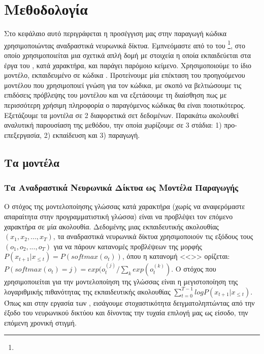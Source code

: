 \chapter{Μεθοδολογία}
Στο κεφάλαιο αυτό περιγράφεται η προσέγγιση μας στην παραγωγή κώδικα χρησιμοποιώντας αναδραστικά νευρωνικά δίκτυα.
Εμπνεόμαστε από το  του \footnote{}, στο οποίο χρησιμοποιείται μια σχετικά απλή δομή  με  στοιχεία η οποία εκπαιδεύεται στα έργα του , κατά χαρακτήρα, και παράγει παρόμοιο κείμενο.
Χρησιμοποιούμε το ίδιο μοντέλο, εκπαιδευμένο σε κώδικα .
Προτείνουμε μία επέκταση του προηγούμενου μοντέλου που χρησιμοποιεί  γνώση για τον κώδικα, με σκοπό να βελτιώσουμε τις επιδόσεις πρόβλεψης του μοντέλου και να εξετάσουμε τη διαίσθηση πως με περισσότερη χρήσιμη πληροφορία ο παραγόμενος κώδικας θα είναι ποιοτικότερος.
Εξετάζουμε τα μοντέλα σε 2 διαφορετικά σετ δεδομένων.
Παρακάτω ακολουθεί αναλυτική παρουσίαση της μεθόδου, την οποία χωρίζουμε σε 3 στάδια: 1) προ-επεξεργασία, 2) εκπαίδευση και 3) παραγωγή.

\section{Τα μοντέλα}

\subsection{Τα Αναδραστικά Νευρωνικά Δίκτυα ως Μοντέλα Παραγωγής}
Ο στόχος της μοντελοποίησης γλώσσας κατά χαρακτήρα (χωρίς να αναφερόμαστε απαραίτητα στην προγραμματιστική γλώσσα) είναι να προβλέψει τον επόμενο χαρακτήρα σε μία ακολουθία.
Δεδομένης μιας εκπαιδευτικής ακολουθίας $(x_1, x_2, ..., x_T)$, τα αναδραστικά νευρωνικά δίκτυα χρησιμοποιούν τις εξόδους τους $(ο_1, ο_2, ..., ο_T)$ για να πάρουν κατανομές προβλέψεων της μορφής $P(x_{t+1}|x_{\leq{t}}) = P(softmax(o_t))$, όπου η κατανομή <<>> ορίζεται: $P(softmax(o_t) = j) = exp(o_t^{(j)}/\sum_k exp(o_t^{(k)})$.
Ο στόχος που χρησιμοποιείται για την μοντελοποίηση της γλώσσας είναι η μεγιστοποίηση της λογαριθμικής πιθανότητας της εκπαιδευτικής ακολουθίας $\sum_{t=0}^{T-1}logP(x_{t+1}|x_{\leq{t}})$.
Όπως και στην εργασία των  \cite{Graves2013}, εισάγουμε στοχαστικότητα δειγματοληπτώντας από την έξοδο του νευρωνικού δικτύου και δίνοντας την τυχαία επιλογή μας ως είσοδο, την επόμενη χρονική στιγμή.

